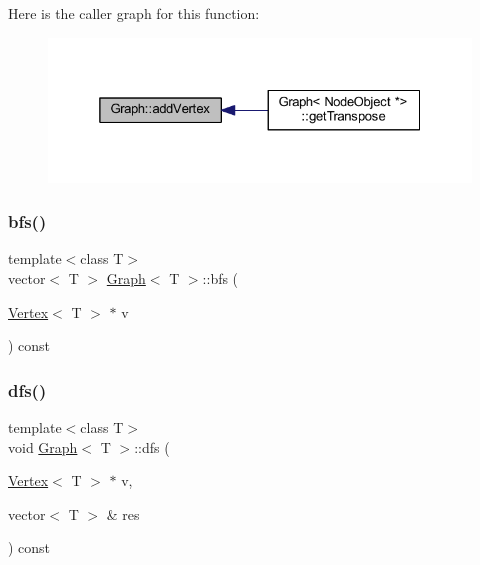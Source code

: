 Here is the caller graph for this function\+:
\nopagebreak
\begin{figure}[H]
\begin{center}
\leavevmode
\includegraphics[width=325pt]{class_graph_a00be284ea2be3b3d0f0d2e493b70245b_icgraph}
\end{center}
\end{figure}
\mbox{\label{class_graph_a56a5ea2c3aa7c0bd3849849be404a631}} 
\subsubsection{\texorpdfstring{bfs()}{bfs()}}
{\footnotesize\ttfamily template$<$class T$>$ \\
vector$<$ T $>$ \hyperlink{class_graph}{Graph}$<$ T $>$\+::bfs (\begin{DoxyParamCaption}\item[{\hyperlink{class_vertex}{Vertex}$<$ T $>$ $\ast$}]{v }\end{DoxyParamCaption}) const}

\mbox{\label{class_graph_abf3a280505ad7abd0ff83f45eb807c41}} 
\subsubsection{\texorpdfstring{dfs()}{dfs()}\hspace{0.1cm}{\footnotesize\ttfamily [1/2]}}
{\footnotesize\ttfamily template$<$class T$>$ \\
void \hyperlink{class_graph}{Graph}$<$ T $>$\+::dfs (\begin{DoxyParamCaption}\item[{\hyperlink{class_vertex}{Vertex}$<$ T $>$ $\ast$}]{v,  }\item[{vector$<$ T $>$ \&}]{res }\end{DoxyParamCaption}) const\hspace{0.3cm}{\ttfamily [private]}}


